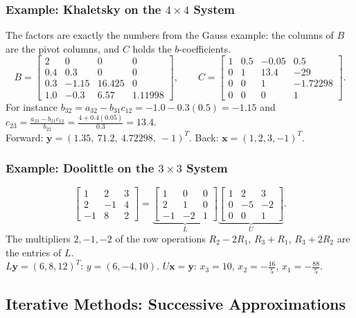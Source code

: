 \documentclass[hidelinks]{article}
\begin{document}
\subsubsection{Example: Khaletsky on the $4\times4$ System}

The factors are exactly the numbers from the Gauss example: the columns of $B$ are the pivot columns, and $C$ holds the $b$-coefficients.
\[
B=\begin{bmatrix}2&0&0&0\\0.4&0.3&0&0\\0.3&-1.15&16.425&0\\1.0&-0.3&6.57&1.11998\end{bmatrix},\qquad
C=\begin{bmatrix}1&0.5&-0.05&0.5\\0&1&13.4&-29\\0&0&1&-1.72298\\0&0&0&1\end{bmatrix}.
\]
For instance $b_{32}=a_{32}-b_{31}c_{12}=-1.0-0.3(0.5)=-1.15$ and $c_{23}=\frac{a_{23}-b_{21}c_{13}}{b_{22}}=\frac{4+0.4(0.05)}{0.3}=13.4$.\\
Forward: $\mathbf y=(1.35,\ 71.2,\ 4.72298,\ -1)^T$. Back: $\mathbf x=(1,2,3,-1)^T$.

\subsubsection{Example: Doolittle on the $3\times3$ System}

\[
\begin{bmatrix}1&2&3\\2&-1&4\\-1&8&2\end{bmatrix}
=\underbrace{\begin{bmatrix}1&0&0\\2&1&0\\-1&-2&1\end{bmatrix}}_{L}
\underbrace{\begin{bmatrix}1&2&3\\0&-5&-2\\0&0&1\end{bmatrix}}_{U}.
\]
The multipliers $2,-1,-2$ of the row operations $R_2-2R_1$, $R_3+R_1$, $R_3+2R_2$ are the entries of $L$.\\
$L\mathbf y=(6,8,12)^T$: $y=(6,-4,10)$. $U\mathbf x=\mathbf y$: $x_3=10$, $x_2=-\frac{16}5$, $x_1=-\frac{88}5$.

\subsection{Iterative Methods: Successive Approximations}\label{sec:iterative}
\end{document}

